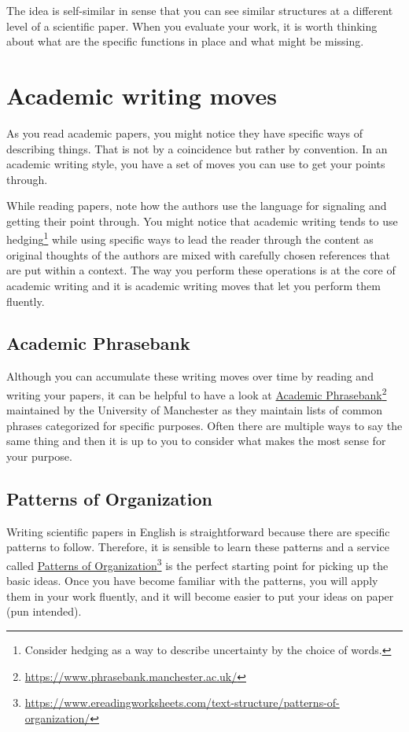 The idea is self-similar in sense that you can see similar structures at a different level of a scientific paper.
When you evaluate your work, it is worth thinking about what are the specific functions in place and what might be missing.

\section{Academic writing moves}

As you read academic papers, you might notice they have specific ways of describing things.
That is not by a coincidence but rather by convention.
In an academic writing style, you have a set of moves \citep{aull2020students} you can use to get your points through.

While reading papers, note how the authors use the language for signaling and getting their point through.
You might notice that academic writing tends to use hedging\footnote{Consider hedging as a way to describe uncertainty by the choice of words.} while using specific ways to lead the reader through the content as original thoughts of the authors are mixed with carefully chosen references that are put within a context.
The way you perform these operations is at the core of academic writing and it is academic writing moves that let you perform them fluently.

\subsection{Academic Phrasebank}

Although you can accumulate these writing moves over time by reading and writing your papers, it can be helpful to have a look at \href{https://www.phrasebank.manchester.ac.uk/}{Academic Phrasebank}\footnote{\url{https://www.phrasebank.manchester.ac.uk/}} maintained by the University of Manchester as they maintain lists of common phrases categorized for specific purposes.
Often there are multiple ways to say the same thing and then it is up to you to consider what makes the most sense for your purpose.

\subsection{Patterns of Organization}

Writing scientific papers in English is straightforward because there are specific patterns to follow.
Therefore, it is sensible to learn these patterns and a service called \href{https://www.ereadingworksheets.com/text-structure/patterns-of-organization/}{Patterns of Organization}\footnote{\url{https://www.ereadingworksheets.com/text-structure/patterns-of-organization/}} is the perfect starting point for picking up the basic ideas.
Once you have become familiar with the patterns, you will apply them in your work fluently, and it will become easier to put your ideas on paper (pun intended).

